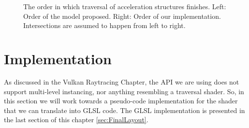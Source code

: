 \begin{figure}
    \hfill
    \hfill
    \hfill
    \caption{The order in which traversal of acceleration structures finishes. Left: Order of the model proposed. Right: Order of our implementation. Intersections are assumed to happen from left to right.}
    \label{fig:TraversalOrder}
\end{figure}

\newpage
\section{Implementation}
\label{sec:Implementation}
As discussed in the Vulkan Raytracing Chapter, the API we are using does not support multi-level instancing, nor anything resembling a traversal shader. So, in this section we will work towards a pseudo-code implementation for the shader that we can translate into GLSL code. The GLSL implementation is presented in the last section of this chapter \ref{sec:FinalLayout}.
